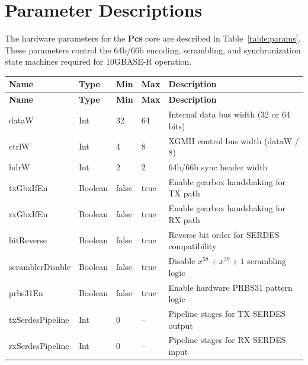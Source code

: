 
\section{Parameter Descriptions}

The hardware parameters for the \textbf{Pcs} core are described in Table~\ref{table:params}. These parameters control the 64b/66b encoding, scrambling, and synchronization state machines required for 10GBASE-R operation.

\renewcommand*{\arraystretch}{1.4}
\begin{longtable}[H]{
    | p{}
    | p{}
    | p{}
    | p{}
    | p{} |
  }
  \hline
  \textbf{Name} & \textbf{Type} & \textbf{Min} & \textbf{Max} & \textbf{Description} \\ \hline \hline
  \endfirsthead
  \hline
  \textbf{Name} & \textbf{Type} & \textbf{Min} & \textbf{Max} & \textbf{Description} \\ \hline \hline
  \endhead

  dataW         & Int     & 32      & 64      & Internal data bus width (32 or 64 bits) \\ \hline
  ctrlW         & Int     & 4       & 8       & XGMII control bus width (dataW / 8) \\ \hline
  hdrW          & Int     & 2       & 2       & 64b/66b sync header width \\ \hline

  txGbxIfEn     & Boolean & false   & true    & Enable gearbox handshaking for TX path \\ \hline
  rxGbxIfEn     & Boolean & false   & true    & Enable gearbox handshaking for RX path \\ \hline
  bitReverse    & Boolean & false   & true    & Reverse bit order for SERDES compatibility \\ \hline

  scramblerDisable & Boolean & false & true  & Disable $x^{58} + x^{39} + 1$ scrambling logic \\ \hline
  prbs31En      & Boolean & false   & true    & Enable hardware PRBS31 pattern logic \\ \hline

  txSerdesPipeline & Int  & 0       & --      & Pipeline stages for TX SERDES output \\ \hline
  rxSerdesPipeline & Int  & 0       & --      & Pipeline stages for RX SERDES input \\ \hline


\end{longtable}
